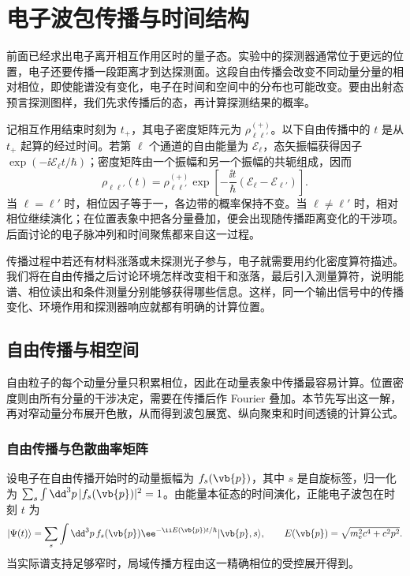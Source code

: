 \chapter{电子波包传播与时间结构}\label{chap:prop-measure}

前面已经求出电子离开相互作用区时的量子态。实验中的探测器通常位于更远的位置，电子还要传播一段距离才到达探测面。这段自由传播会改变不同动量分量的相对相位，即使能谱没有变化，电子在时间和空间中的分布也可能改变。要由出射态预言探测图样，我们先求传播后的态，再计算探测结果的概率。

记相互作用结束时刻为 $t_+$，其电子密度矩阵元为 $\rho_{\ell\ell'}^{(+)}$。以下自由传播中的 $t$ 是从 $t_+$ 起算的经过时间。若第 $\ell$ 个通道的自由能量为 $\mathcal E_\ell$，态矢振幅获得因子 $\exp(-\ii\mathcal E_\ell t/\hbar)$；密度矩阵由一个振幅和另一个振幅的共轭组成，因而
\begin{equation}
{
\rho_{\ell\ell'}(t)
=\rho_{\ell\ell'}^{(+)}
\exp\!\left[-\frac{\ii t}{\hbar}
(\mathcal E_\ell-\mathcal E_{\ell'})\right].}
\label{eq:sideband_coherence_free_propagation_master}
\end{equation}
当 $\ell=\ell'$ 时，相位因子等于一，各边带的概率保持不变。当 $\ell\ne\ell'$ 时，相对相位继续演化；在位置表象中把各分量叠加，便会出现随传播距离变化的干涉项。后面讨论的电子脉冲列和时间聚焦都来自这一过程。

传播过程中若还有材料涨落或未探测光子参与，电子就需要用约化密度算符描述。我们将在自由传播之后讨论环境怎样改变相干和涨落，最后引入测量算符，说明能谱、相位读出和条件测量分别能够获得哪些信息。这样，同一个输出信号中的传播变化、环境作用和探测器响应就都有明确的计算位置。

\section{自由传播与相空间}

自由粒子的每个动量分量只积累相位，因此在动量表象中传播最容易计算。位置密度则由所有分量的干涉决定，需要在传播后作 Fourier 叠加。本节先写出这一解，再对窄动量分布展开色散，从而得到波包展宽、纵向聚束和时间透镜的计算公式。

\subsection{自由传播与色散曲率矩阵}

设电子在自由传播开始时的动量振幅为 $f_s(\vb{p})$，其中 $s$ 是自旋标签，归一化为 $\sum_s\int\dd^3p\,|f_s(\vb{p})|^2=1$。由能量本征态的时间演化，正能电子波包在时刻 $t$ 为
\begin{equation*}
|\Psi(t)\rangle
=\sum_s\int\dd^3 p\,f_s(\vb{p})
\ee^{-\ii E(\vb{p})t/\hbar}|\vb{p},s\rangle,
\qquad
E(\vb{p})=\sqrt{m_{\mathrm e}^2c^4+c^2p^2}.
\end{equation*}
当实际谱支持足够窄时，局域传播方程由这一精确相位的受控展开得到。

